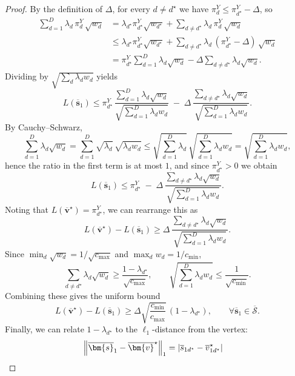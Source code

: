 \begin{proof}
  By the definition of $\Delta$, for every $d\neq d^\star$ we have $\pi_d^Y\le \pi_{d^\star}^Y-\Delta$, so
  \begin{align*}
    \sum_{d=1}^D \lambda_d\,\pi_d^Y\,\sqrt{w_d}
    &=
    \lambda_{d^\star} \pi_{d^\star}^Y\sqrt{w_{d^\star}}
    +\sum_{d\neq d^\star}\lambda_d\,\pi_d^Y\,\sqrt{w_d} \\
    &\le
    \lambda_{d^\star} \pi_{d^\star}^Y\sqrt{w_{d^\star}}
    +\sum_{d\neq d^\star}\lambda_d\,(\pi_{d^\star}^Y-\Delta)\,\sqrt{w_d} \\
    &=
    \pi_{d^\star}^Y\sum_{d=1}^D \lambda_d\sqrt{w_d}
    -\Delta\sum_{d\neq d^\star}\lambda_d\sqrt{w_d}.
  \end{align*}
  Dividing by $\sqrt{\sum_d \lambda_d w_d}$ yields
  \[
    L(\overline{\bm{s}}_1)
    \le
    \pi_{d^\star}^Y\,
    \frac{\sum_{d=1}^D \lambda_d\sqrt{w_d}}{\sqrt{\sum_{d=1}^D \lambda_d w_d}}
    \;-\;
    \Delta\,
    \frac{\sum_{d\neq
    d^\star}\lambda_d\sqrt{w_d}}{\sqrt{\sum_{d=1}^D \lambda_d w_d}}.
  \]
  By Cauchy--Schwarz,
  \[
    \sum_{d=1}^D \lambda_d\sqrt{w_d}
    =
    \sum_{d=1}^D \sqrt{\lambda_d}\,\sqrt{\lambda_d w_d}
    \le
    \sqrt{\sum_{d=1}^D \lambda_d}\,\sqrt{\sum_{d=1}^D \lambda_d w_d}
    =
    \sqrt{\sum_{d=1}^D \lambda_d w_d},
  \]
  hence the ratio in the first term is at most $1$, and since $\pi_{d^\star}^Y>0$ we obtain
  \[
    L(\overline{\bm{s}}_1)
    \le
    \pi_{d^\star}^Y
    \;-\;
    \Delta\,
    \frac{\sum_{d\neq
    d^\star}\lambda_d\sqrt{w_d}}{\sqrt{\sum_{d=1}^D \lambda_d w_d}}.
  \]
  Noting that $L(\overline{\bm{v}}^\star)=\pi_{d^\star}^Y$, we can rearrange this as
  \[
    L(\overline{\bm{v}}^\star)-L(\overline{\bm{s}}_1)
    \ge
    \Delta\,
    \frac{\sum_{d\neq
    d^\star}\lambda_d\sqrt{w_d}}{\sqrt{\sum_{d=1}^D \lambda_d w_d}}.
  \]
  Since $\min_d \sqrt{w_d}=1/\sqrt{c_{\max}}$ and $\max_d w_d = 1/c_{\min}$,
  \[
    \sum_{d\neq d^\star}\lambda_d\sqrt{w_d}
    \ge
    \frac{1-\lambda_{d^\star}}{\sqrt{c_{\max}}},
    \qquad
    \sqrt{\sum_{d=1}^D \lambda_d w_d}
    \le
    \frac{1}{\sqrt{c_{\min}}}.
  \]
  Combining these gives the uniform bound
  \[
    L(\overline{\bm{v}}^\star)-L(\overline{\bm{s}}_1)
    \ge
    \Delta\sqrt{\frac{c_{\min}}{c_{\max}}}\,(1-\lambda_{d^\star}),
    \qquad \forall\overline{\bm{s}}_1\in\overline{\mathcal{S}}.
  \]
  Finally, we can relate $1-\lambda_{d^\star}$ to the $\ell_1$-distance from the vertex:
  \begin{align*}
    \norm{\overline{\bm{s}}_1-\overline{\bm{v}}^\star}_1
    &=
    \left|\overline{s}_{1d^\star}-\overline{v}_{1d^\star}^\star\right|

\end{align*}
\end{proof}
